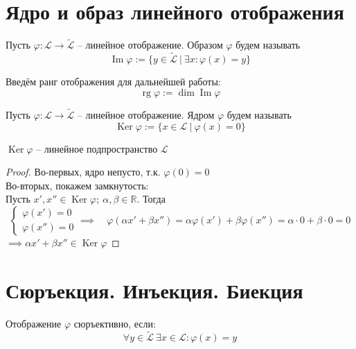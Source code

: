 \documentclass[11pt]{article}
\DeclareMathOperator{\Imm}{Im}
\DeclareMathOperator{\Ker}{Ker}
\DeclareMathOperator{\rg}{rg}
\begin{document}
\section{Ядро и образ линейного отображения}

\begin{definition}
  Пусть $\varphi \colon \mathcal{L} \to \widetilde{\mathcal{L}}$ -- линейное отображение. 
  Образом $\varphi$ будем называть 
  \[\Imm \varphi := \{y \in \widetilde{\mathcal{L}} \ | \ \exists x: \varphi (x) = y\}\]
\end{definition}

\begin{definition}
  Введём ранг отображения для дальнейшей работы: 
  \[\rg \varphi := \dim \Imm \varphi\]
\end{definition}

\begin{definition}
  Пусть $\varphi \colon \mathcal{L} \to \widetilde{\mathcal{L}}$ -- линейное отображение. 
  Ядром $\varphi$ будем называть 
  \[\Ker \varphi := \{x \in \mathcal{L} \ | \ \varphi (x) = 0\}\]
\end{definition}

\begin{lemma}
  $\Ker \varphi$ -- линейное подпространство $\mathcal{L}$
\end{lemma}

\begin{proof}
  Во-первых, ядро непусто, т.к. $\varphi (0) = 0$ \\
  Во-вторых, покажем замкнутость: \\
  Пусть $x', x'' \in \Ker \varphi; \ \alpha, \beta \in \mathbb{R}$. Тогда 
  \[
  \begin{cases}
    \varphi (x') = 0 \\
    \varphi (x'') = 0
  \end{cases} 
  \implies \quad \varphi (\alpha x' + \beta x'') = \alpha \varphi (x') + \beta \varphi (x'') = 
  \alpha \cdot 0 + \beta \cdot 0 = 0
  \]
  $\implies \alpha x' + \beta x'' \in \Ker \varphi$
\end{proof}

\section{Сюръекция. Инъекция. Биекция}

\begin{definition}
  Отображение $\varphi$ сюръективно, если: 
  \[\forall y \in \widetilde{\mathcal{L}} \ \exists x \in \mathcal{L}: \varphi (x) = y\]
\end{definition}
\end{document}
